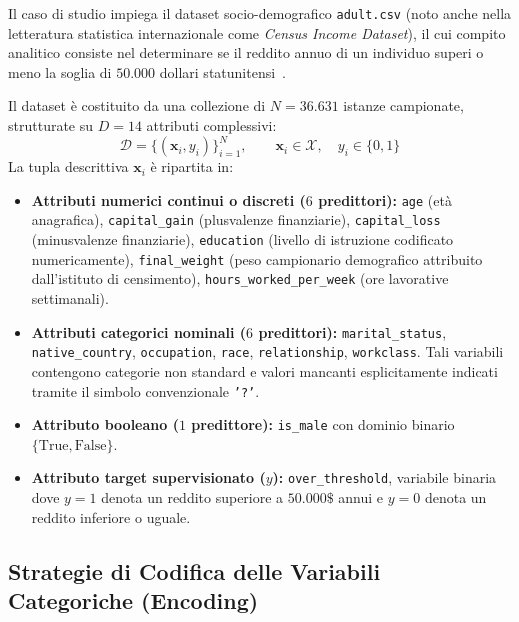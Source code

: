 Il caso di studio impiega il dataset socio-demografico \texttt{adult.csv} (noto anche nella letteratura statistica internazionale come \textit{Census Income Dataset}), il cui compito analitico consiste nel determinare se il reddito annuo di un individuo superi o meno la soglia di $50.000$ dollari statunitensi~\cite{tan2018}.

\begin{definition}
Il dataset è costituito da una collezione di $N = 36.631$ istanze campionate, strutturate su $D = 14$ attributi complessivi:
\begin{equation}
    \mathcal{D} = \{ (\mathbf{x}_i, y_i) \}_{i=1}^N, \qquad \mathbf{x}_i \in \mathcal{X}, \quad y_i \in \{0, 1\}
\end{equation}
La tupla descrittiva $\mathbf{x}_i$ è ripartita in:
\begin{itemize}
    \item \textbf{Attributi numerici continui o discreti ($6$ predittori):} \texttt{age} (età anagrafica), \texttt{capital\_gain} (plusvalenze finanziarie), \texttt{capital\_loss} (minusvalenze finanziarie), \texttt{education} (livello di istruzione codificato numericamente), \texttt{final\_weight} (peso campionario demografico attribuito dall'istituto di censimento), \texttt{hours\_worked\_per\_week} (ore lavorative settimanali).
    \item \textbf{Attributi categorici nominali ($6$ predittori):} \texttt{marital\_status}, \texttt{native\_country}, \texttt{occupation}, \texttt{race}, \texttt{relationship}, \texttt{workclass}. Tali variabili contengono categorie non standard e valori mancanti esplicitamente indicati tramite il simbolo convenzionale \texttt{'?'}.
    \item \textbf{Attributo booleano ($1$ predittore):} \texttt{is\_male} con dominio binario $\{\text{True}, \text{False}\}$.
    \item \textbf{Attributo target supervisionato ($y$):} \texttt{over\_threshold}, variabile binaria dove $y=1$ denota un reddito superiore a $50.000\$$ annui e $y=0$ denota un reddito inferiore o uguale.
\end{itemize}
\end{definition}

\FloatBarrier
\subsection{Strategie di Codifica delle Variabili Categoriche (Encoding)}
\label{subsec:dm-lab-encoding}

